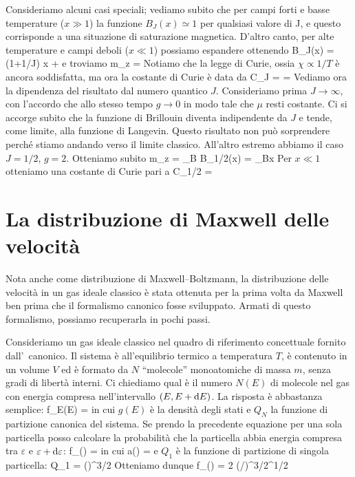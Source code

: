 Consideriamo alcuni casi speciali; vediamo subito che per campi forti e basse temperature ($x \gg 1$) la funzione $B_J(x) \simeq 1$ per qualsiasi valore di J, e questo corrisponde a una situazione di saturazione magnetica. D'altro canto, per alte temperature e campi deboli ($x \ll 1$) possiamo espandere ottenendo
\be
B_J(x) = (1+1/J) x + \cdots
\ee
e troviamo
\be
m_z = 
\ee
Notiamo che la legge di Curie, ossia $\chi \propto 1/T$ è ancora soddisfatta, ma ora la costante di Curie è data da
\be
C_J =  = 
\ee
Vediamo ora la dipendenza del risultato dal numero quantico $J$. Consideriamo prima $J\to\infty$, con l'accordo che allo stesso tempo $g\to 0$ in modo tale che $\mu$ resti costante. Ci si accorge subito che la funzione di Brillouin diventa indipendente da $J$ e tende, come limite, alla funzione di Langevin. Questo risultato non può sorprendere perché stiamo andando verso il limite classico. All'altro estremo abbiamo il caso $J=1/2$, $g=2$. Otteniamo subito
\be
m_z = \mu_B B_{1/2}(x) = \mu_B\tanh x
\ee
Per $x\ll 1$ otteniamo una costante di Curie pari a
\be
C_{1/2} = 
\ee

\section{La distribuzione di Maxwell delle velocità}
\label{sec:04-maxwell}

Nota anche come distribuzione di Maxwell--Boltzmann, la distribuzione delle velocità in un gas ideale classico è stata ottenuta per la prima volta da Maxwell ben prima che il formalismo canonico fosse sviluppato. Armati di questo formalismo, possiamo recuperarla in pochi passi.

Consideriamo un gas ideale classico nel quadro di riferimento concettuale fornito dall'\ensemble\ canonico. Il sistema è all'equilibrio termico a temperatura $T$, è contenuto in un volume $V$ ed è formato da $N$ ``molecole'' monoatomiche di massa $m$, senza gradi di libertà interni. Ci chiediamo qual è il numero $N(E)$ di molecole nel gas con energia compresa nell'intervallo $(E,E+{\textrm d}E)$. La risposta è abbastanza semplice:
%
\be
{} \equiv f_{E}(E) = 
\ee
%
in cui $g(E)$ è la densità degli stati e $Q_{N}$ la funzione di partizione canonica del sistema. Se prendo la precedente equazione per una sola particella posso calcolare la probabilità che la particella abbia energia compresa tra $\varepsilon$ e $\varepsilon+{\textrm d}\varepsilon$:
%
\be
f_{\varepsilon}(\varepsilon)\de{\varepsilon} = 
\ee
%
in cui
%
\be
a(\varepsilon) = 
\ee
%
e $Q_{1}$ è la funzione di partizione di singola particella:
%
\be
Q_{1} = \left(\right)^{3/2}
\ee
%
Otteniamo dunque
%
\be
f_{\varepsilon}(\varepsilon)\de{\varepsilon} = 2 (\beta/\pi)^{3/2}\varepsilon^{1/2}\de{\varepsilon}
\ee
%

